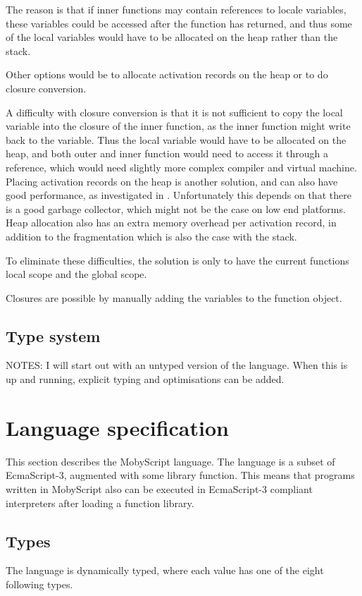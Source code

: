 The reason is that if inner functions may contain references to locale variables, these variables could be accessed after the function has returned, and thus some of the local variables would have to be allocated on the heap rather than the stack.

Other options would be to allocate activation records on the heap or to do closure conversion.

A difficulty with closure conversion is that it is not sufficient to copy the local variable into the closure of the inner function, as the inner function might write back to the variable. Thus the local variable would have to be allocated on the heap, and both outer and inner function would need to access it through a reference, which would need slightly more complex compiler and virtual machine. 
Placing activation records on the heap is another solution, and can also have good performance, as investigated in \cite{appel94stack}. 
Unfortunately this depends on that there is a good garbage collector, which might not be the case on low end platforms. 
Heap allocation also has an extra memory overhead per activation record, in addition to the fragmentation which is also the case with the stack.

To eliminate these difficulties, the solution is only to have the current functions local scope and the global scope. 

Closures are possible by manually adding the variables to the function object.

\subsection{Type system}
NOTES:
I will start out with an untyped version of the language. 
When this is up and running, explicit typing and optimisations can be added.

\section{Language specification}

This section describes the MobyScript language.
The language is a subset of EcmaScript-3, augmented with some library function. 
This means that programs written in MobyScript also can be executed in EcmaScript-3 compliant interpreters after loading a function library.


\subsection{Types}
The language is dynamically typed, where each value has one of the eight following types.

